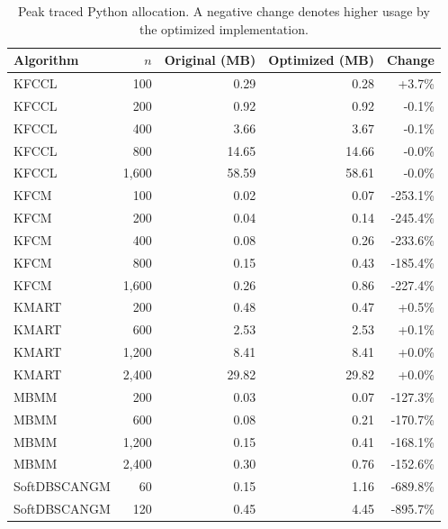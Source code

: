 \begin{table}[t]
\centering
\caption{Peak traced Python allocation. A negative change denotes higher usage by the optimized implementation.}
\label{tab:memory}
\begin{tabular}{lrrrr}
\toprule
Algorithm & $n$ & Original (MB) & Optimized (MB) & Change \\
\midrule
KFCCL & 100 & 0.29 & 0.28 & +3.7\% \\
KFCCL & 200 & 0.92 & 0.92 & -0.1\% \\
KFCCL & 400 & 3.66 & 3.67 & -0.1\% \\
KFCCL & 800 & 14.65 & 14.66 & -0.0\% \\
KFCCL & 1,600 & 58.59 & 58.61 & -0.0\% \\
KFCM & 100 & 0.02 & 0.07 & -253.1\% \\
KFCM & 200 & 0.04 & 0.14 & -245.4\% \\
KFCM & 400 & 0.08 & 0.26 & -233.6\% \\
KFCM & 800 & 0.15 & 0.43 & -185.4\% \\
KFCM & 1,600 & 0.26 & 0.86 & -227.4\% \\
KMART & 200 & 0.48 & 0.47 & +0.5\% \\
KMART & 600 & 2.53 & 2.53 & +0.1\% \\
KMART & 1,200 & 8.41 & 8.41 & +0.0\% \\
KMART & 2,400 & 29.82 & 29.82 & +0.0\% \\
MBMM & 200 & 0.03 & 0.07 & -127.3\% \\
MBMM & 600 & 0.08 & 0.21 & -170.7\% \\
MBMM & 1,200 & 0.15 & 0.41 & -168.1\% \\
MBMM & 2,400 & 0.30 & 0.76 & -152.6\% \\
SoftDBSCANGM & 60 & 0.15 & 1.16 & -689.8\% \\
SoftDBSCANGM & 120 & 0.45 & 4.45 & -895.7\% \\
\bottomrule
\end{tabular}
\end{table}
